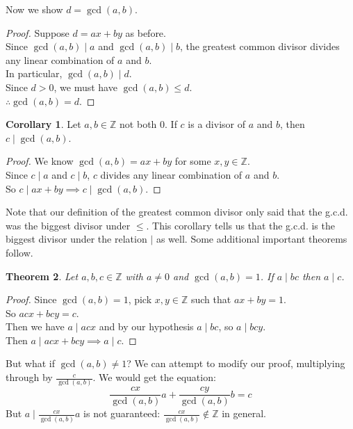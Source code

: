 \documentclass[11pt]{amsart}
\newtheorem{theorem}{Theorem}[section]
\theoremstyle{definition}
\newtheorem{corollary}[theorem]{Corollary}
\newcommand{\integers}{\mathbb{Z}}
\begin{document}
Now we show $d = \gcd(a, b)$.
\begin{proof}
	Suppose $d = ax + by$ as before. \\
	Since $\gcd(a, b) \mid a$ and $\gcd(a, b) \mid b$, the greatest common divisor divides any linear combination of $a$ and $b$. \\
	In particular, $\gcd(a, b) \mid d$. \\
	Since $d > 0$, we must have $\gcd(a, b) \leq d$. \\
	$\therefore \gcd(a, b) = d$.
\end{proof}
\begin{corollary}
	Let $a, b \in \integers$ not both 0. If $c$ is a divisor of $a$ and $b$, then $c \mid \gcd(a, b)$.
\end{corollary}
\begin{proof}
	We know $\gcd(a, b) = ax + by$ for some $x, y \in \integers$. \\
	Since $c \mid a$ and $c \mid b$, $c$ divides any linear combination of $a$ and $b$. \\
	So $c \mid ax + by \implies c \mid \gcd(a, b)$.
\end{proof}
Note that our definition of the greatest common divisor only said that the g.c.d. was the biggest divisor under $\leq$. This corollary tells us that
the g.c.d. is the biggest divisor under the relation $\mid$ as well. Some additional important theorems follow.
\begin{theorem}
	Let $a, b, c \in \integers$ with $a \neq 0$ and $\gcd(a, b) = 1$. If $a \mid bc$ then $a \mid c$.
\end{theorem}
\begin{proof}
	Since $\gcd(a, b) = 1$, pick $x, y \in \integers$ such that $ax + by = 1$. \\
	So $acx + bcy = c$. \\
	Then we have $a \mid acx$ and by our hypothesis $a \mid bc$, so $a \mid bcy$. \\
	Then $a \mid acx + bcy \implies a \mid c$.
\end{proof}
But what if $\gcd(a, b) \neq 1$? We can attempt to modify our proof, multiplying through by $\frac{c}{\gcd(a,b)}$. We would get the equation:
\[	\frac{cx}{\gcd(a,b)}a + \frac{cy}{\gcd(a,b)}b = c	\]
But $a \mid \frac{cx}{\gcd(a,b)}a$ is not guaranteed: $\frac{cx}{\gcd(a,b)} \notin \integers$ in general.
\end{document}
